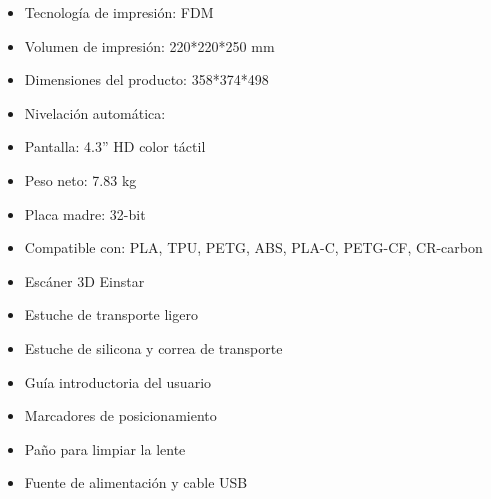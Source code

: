 \documentclass[compacto,5pt,comentarios]{aleph-notas}
\begin{document}

\begin{car}
\begin{itemize}
    \item Tecnología de impresión: FDM
    \item Volumen de impresión: 220*220*250 mm
    \item Dimensiones del producto: 358*374*498
    \item Nivelación automática:
    \item Pantalla: 4.3'' HD color táctil
    \item Peso neto: 7.83 kg
    \item Placa madre: 32-bit
    \item Compatible con: PLA, TPU, PETG, ABS, PLA-C, PETG-CF, CR-carbon
\end{itemize}
\end{car}

\begin{cont}
\begin{itemize}
    \item Escáner 3D Einstar
    \item Estuche de transporte ligero
    \item Estuche de silicona y correa de transporte
    \item Guía introductoria del usuario
    \item Marcadores de posicionamiento
    \item Paño para limpiar la lente
    \item Fuente de alimentación y cable USB
\end{itemize}
\end{cont}
\end{document}
